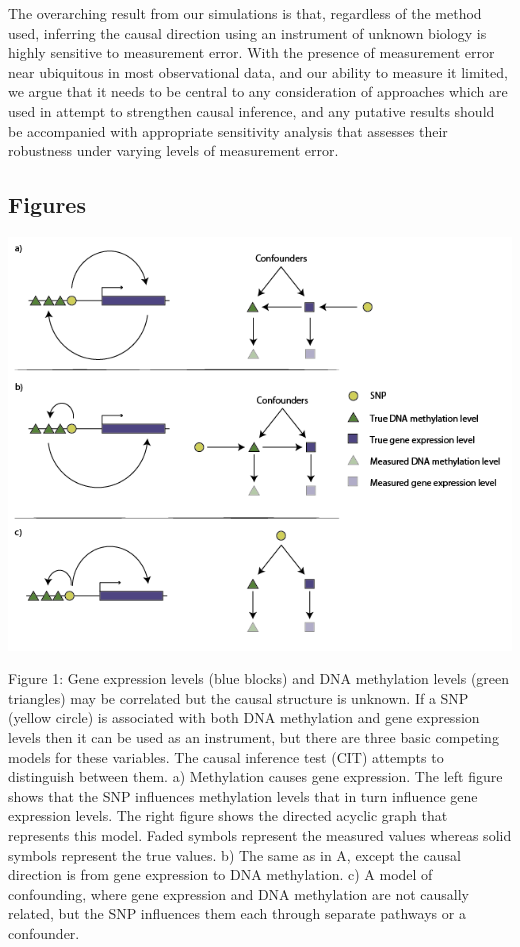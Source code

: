 \documentclass[]{article}
\begin{document}
The overarching result from our simulations is that, regardless of the
method used, inferring the causal direction using an instrument of
unknown biology is highly sensitive to measurement error. With the
presence of measurement error near ubiquitous in most observational
data, and our ability to measure it limited, we argue that it needs to
be central to any consideration of approaches which are used in attempt
to strengthen causal inference, and any putative results should be
accompanied with appropriate sensitivity analysis that assesses their
robustness under varying levels of measurement error.

\newpage

\subsection{Figures}\label{figures}

\includegraphics{../images/dag-01.png}

Figure 1: Gene expression levels (blue blocks) and DNA methylation
levels (green triangles) may be correlated but the causal structure is
unknown. If a SNP (yellow circle) is associated with both DNA
methylation and gene expression levels then it can be used as an
instrument, but there are three basic competing models for these
variables. The causal inference test (CIT) attempts to distinguish
between them. a) Methylation causes gene expression. The left figure
shows that the SNP influences methylation levels that in turn influence
gene expression levels. The right figure shows the directed acyclic
graph that represents this model. Faded symbols represent the measured
values whereas solid symbols represent the true values. b) The same as
in A, except the causal direction is from gene expression to DNA
methylation. c) A model of confounding, where gene expression and DNA
methylation are not causally related, but the SNP influences them each
through separate pathways or a confounder.
\end{document}
